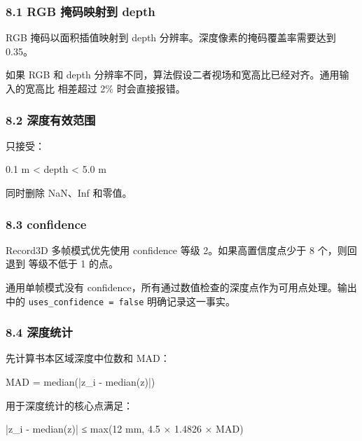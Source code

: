 \documentclass[
  chinese,
  11pt,
  a4paper,
]{article}
\newenvironment{Shaded}{\begin{snugshade}}{\end{snugshade}}
\newcommand{\NormalTok}[1]{#1}
\begin{document}
\subsubsection{8.1 RGB 掩码映射到
depth}\label{81-rgb-ux63a9ux7801ux6620ux5c04ux5230-depth}

RGB 掩码以面积插值映射到 depth 分辨率。深度像素的掩码覆盖率需要达到
0.35。

如果 RGB 和 depth
分辨率不同，算法假设二者视场和宽高比已经对齐。通用输入的宽高比 相差超过
2\% 时会直接报错。

\subsubsection{8.2
深度有效范围}\label{82-ux6df1ux5ea6ux6709ux6548ux8303ux56f4}

只接受：

\begin{Shaded}
\begin{Highlighting}[]
\NormalTok{0.1 m \textless{} depth \textless{} 5.0 m}
\end{Highlighting}
\end{Shaded}

同时删除 NaN、Inf 和零值。

\subsubsection{8.3 confidence}\label{83-confidence}

Record3D 多帧模式优先使用 confidence 等级 2。如果高置信度点少于 8
个，则回退到 等级不低于 1 的点。

通用单帧模式没有
confidence，所有通过数值检查的深度点作为可用点处理。输出中的
\texttt{uses\_confidence\ =\ false} 明确记录这一事实。

\subsubsection{8.4 深度统计}\label{84-ux6df1ux5ea6ux7edfux8ba1}

先计算书本区域深度中位数和 MAD：

\begin{Shaded}
\begin{Highlighting}[]
\NormalTok{MAD = median(|z\_i {-} median(z)|)}
\end{Highlighting}
\end{Shaded}

用于深度统计的核心点满足：

\begin{Shaded}
\begin{Highlighting}[]
\NormalTok{|z\_i {-} median(z)| ≤ max(12 mm, 4.5 × 1.4826 × MAD)}
\end{Highlighting}
\end{Shaded}
\end{document}
